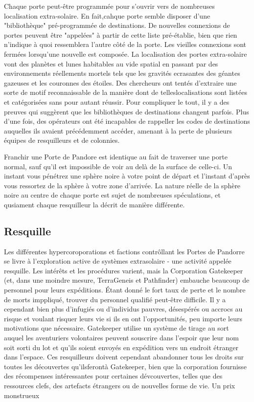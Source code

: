 {Chaque porte peut-être programmée pour s'ouvrir vers de nombreuses localisation extra-solaire. En fait,cahque porte semble disposer d'une "bibliothèque" pré-programmée de destinations. De nouvelles connexions de portes peuvent être "appelées" à partir de cette liste pré-établie, bien que rien n'indique à quoi ressemblera l'autre côté de la porte. Les vieilles connexions sont fermées lorsqu'une nouvelle est composée. La localisation des portes extra-solaire vont des planètes et lunes habitables au vide spatial en passant par des environnements réellements mortels tels que les gravités ecrasantes des géantes gazeuses et les couronnes des étoiles. Des chercheurs ont tentés d'extraire une sorte de motif reconnaissable de la manière dont de telleslocalisations sont listées et catégorisées sans pour autant réussir. Pour compliquer le tout, il y a des preuves qui suggèrent que les bibliothèques de destinations changent parfois. Plus d'une fois, des opérateurs ont été incapables de rappeller les codes de destinations auquelles ils avaient précédemment accéder, amenant à la perte de plusieurs équipes de resquilleurs et de colonnies. 

Franchir une Porte de Pandore est identique au fait de traverser une porte normal, sauf qu'il est impossible de voir au delà de la surface de celle-ci. Un instant vous pénétrez une sphère noire à votre point de départ et l'instant d'après vous ressortez de la sphère à votre zone d'arrivée. La nature réelle de la sphère noire au centre de chaque porte est sujet de nombreuses spéculations, et qusiament chaque resquilleur la décrit de manière différente. 

\subsection{Resquille} 

Les différentes hypercoroporations et factions contrôllant les Portes de Pandorre se livre à l'exploration active de systèmes extrasolaire - une activité appelée resquille. Les intérêts et les procédures varient, mais la Corporation Gatekeeper (et, dans une moindre mesure, TerraGeneis et Pathfinder) embauche beaucoup de personnel pour leurs expéditions. Étant donné le fort taux de perte et le nombre de morts imppliqué, trouver du personnel qualifié peut-être difficile. Il y a cependant bien plus d'infugiés ou d'individus pauvres, désespérés ou accrocs au risque et voulant risquer leurs vie si ils en ont l'opportunités, peu importe leurs motivations que nécessaire. Gatekeeper utilise un système de tirage au sort auquel les aventuriers volontaires peuvent souscrire dans l'espoir que leur nom soit sorti du lot et qu'ils soient envoyés en expédition vers un endroit étranger dans l'espace. Ces resquilleurs doivent cependant abandonner tous les droits sur toutes les découvertes qu'ilsferontà Gatekeeper, bien que la corporation fournisse des récompenses intéressantes pour certaines dévcouvertes, telles que des ressources clefs, des artefacts étrangers ou de nouvelles forme de vie. Un prix monstrueux 

}
